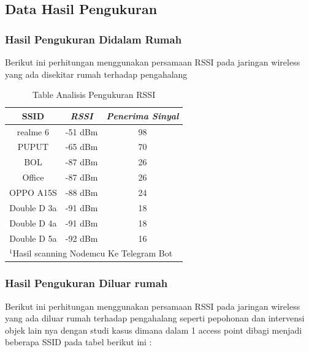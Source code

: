 \documentclass[conference]{IEEEtran}
\begin{document}
\subsection{Data Hasil Pengukuran}
\subsubsection{Hasil Pengukuran Didalam Rumah}
Berikut ini perhitungan menggunakan persamaan RSSI 
pada jaringan wireless yang ada disekitar rumah terhadap pengahalang

    \begin{table}[htbp]
    \caption{Table Analisis Pengukuran RSSI}
    \begin{center}
    \begin{tabular}{|c|c|c|}
        \hline
    \textbf{SSID}&\textbf{\textit{RSSI}}& \textbf{\textit{Penerima Sinyal}} \\
    \hline
    realme 6 & -51 dBm & 98  \\
    \hline
    PUPUT & -65 dBm & 70  \\
    \hline
    BOL & -87 dBm & 26   \\
    \hline
    Office & -87 dBm & 26  \\
    \hline
    OPPO A15S & -88 dBm & 24  \\
    \hline
    Double D 3a & -91 dBm & 18  \\
    \hline
    Double D 4a & -91 dBm & 18  \\
    \hline
    Double D 5a & -92 dBm & 16  \\
    \hline
    \multicolumn{3}{l}{$^{\mathrm{1}}$Hasil scanning Nodemcu Ke Telegram Bot}
    \end{tabular}
    \label{tab1}
    \end{center}
    \end{table}

    \subsubsection{Hasil Pengukuran Diluar rumah}
    Berikut ini perhitungan menggunakan persamaan RSSI 
pada jaringan wireless yang ada diluar rumah
 terhadap pengahalang seperti pepohonan dan intervensi objek lain nya dengan studi kasus dimana dalam 1 access
 point dibagi menjadi beberapa SSID pada tabel berikut ini : 
\end{document}
